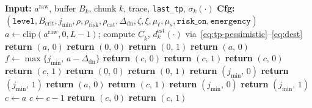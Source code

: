 \documentclass[preprint,12pt,times]{elsarticle}
\begin{document}
\begin{algorithm}[!htbp]
\scriptsize
\caption{QoE-oriented shield core}
\label{alg:shield-v13}
\begin{algorithmic}[1]
\STATE \textbf{Input:} \(a^{\mathrm{raw}}\), buffer \(B_k\), chunk \(k\), trace, \texttt{last\_tp}, \(\sigma_k(\cdot)\)
\STATE \textbf{Cfg:} \((\texttt{level}, B_{\mathrm{crit}}, j_{\min}, \rho, \rho_{\mathrm{risk}}, \rho_{\mathrm{cat}}, \Delta_{\mathrm{dn}}, \zeta, \xi, \mu_{\ell}, \mu_s, \texttt{risk\_on}, \texttt{emergency})\)
\STATE \(a\leftarrow \mathrm{clip}(a^{\mathrm{raw}},0,L{-}1)\); compute \(\underline{C}_k\), \(d^{\mathrm{est}}_k(\cdot)\) via~\eqref{eq:tp-pessimistic}--\eqref{eq:dest}
 \STATE \textbf{return} \((a,\,0)\) \ENDIF
{}
     \STATE \textbf{return} \((0,\,0)\) \ELSE \STATE \textbf{return} \((0,\,1)\) \ENDIF
\ENDIF
{}
    \STATE \textbf{return} \((a,\,0)\)
\ENDIF
{}
    \STATE \(f\leftarrow \max\{j_{\min},\,a-\Delta_{\mathrm{dn}}\}\)
             \STATE \textbf{return} \((c,\,0)\) \ELSE \STATE \textbf{return} \((c,\,1)\) \ENDIF
        \ENDIF
    \ENDFOR
             \STATE \textbf{return} \((c,\,0)\) \ELSE \STATE \textbf{return} \((c,\,1)\) \ENDIF
        \ENDIF
    \ENDFOR
             \STATE \textbf{return} \((0,\,0)\) \ELSE \STATE \textbf{return} \((0,\,1)\) \ENDIF
        \ENDIF
    \ENDIF
     \STATE \textbf{return} \((j_{\min},\,0)\) \ELSE \STATE \textbf{return} \((j_{\min},\,1)\) \ENDIF
\ENDIF
{}
     \STATE \textbf{return} \((a,\,0)\) \ENDIF
         \STATE \textbf{return} \((c,\,1)\) \ENDIF
    \ENDFOR
     \STATE \textbf{return} \((j_{\min},\,0)\) \ELSE \STATE \textbf{return} \((j_{\min},\,1)\) \ENDIF
\ENDIF
\STATE \(c\leftarrow a\)
    \STATE \(c\leftarrow c-1\)
\ENDWHILE
{} \STATE \textbf{return} \((c,\,0)\) \ELSE \STATE \textbf{return} \((c,\,1)\) \ENDIF
\end{algorithmic}
\end{algorithm}
\end{document}
